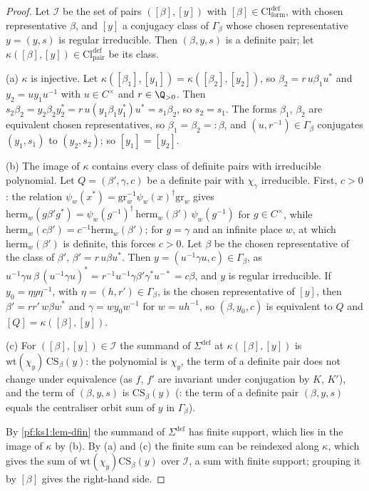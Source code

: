 \begin{proof}
Let $\mathcal I$ be the set of pairs $([\beta],[y])$ with $[\beta]\in\mathrm{Cl}^{\mathrm{def}}_{\mathrm{form}}$, with chosen representative $\beta$,
and $[y]$ a conjugacy class of $\Gamma_\beta$ whose chosen representative $y=(y,s)$ is regular irreducible. Then $(\beta,y,s)$ is a definite pair;
let $\kappa([\beta],[y])\in\mathrm{Cl}^{\mathrm{def}}_{\mathrm{pair}}$ be its class.

(a) $\kappa$ is injective. Let $\kappa([\beta_1],[y_1])=\kappa([\beta_2],[y_2])$, so $\beta_2=r\,u\beta_1u^*$ and $y_2=uy_1u^{-1}$ with $u\in C^\times$ and
$r\in\Q_{>0}$. Then $s_2\beta_2=y_2\beta_2y_2^*=r\,u(y_1\beta_1y_1^*)u^*=s_1\beta_2$, so $s_2=s_1$. The forms $\beta_1$, $\beta_2$ are
equivalent chosen representatives, so $\beta_1=\beta_2=:\beta$, and $(u,r^{-1})\in\Gamma_\beta$ conjugates $(y_1,s_1)$ to $(y_2,s_2)$; so $[y_1]=[y_2]$.

(b) The image of $\kappa$ contains every class of definite pairs with irreducible polynomial. Let $Q=(\beta',\gamma,c)$ be a definite pair with
$\chi_\gamma$ irreducible. First, $c>0$: the relation $\psi_w(x^*)=\mathrm{gr}_w^{-1}\psi_w(x)^\dagger\mathrm{gr}_w$ gives
$\mathrm{herm}_w(g\beta'g^*)=\psi_w(g^{-1})^\dagger\,\mathrm{herm}_w(\beta')\,\psi_w(g^{-1})$ for $g\in C^\times$, while
$\mathrm{herm}_w(c\beta')=c^{-1}\mathrm{herm}_w(\beta')$; for $g=\gamma$ and an infinite place $w$, at which $\mathrm{herm}_w(\beta')$ is definite,
this forces $c>0$. Let $\beta$ be the chosen representative of the class of $\beta'$, $\beta'=r\,u\beta u^*$. Then $y=(u^{-1}\gamma u,c)\in\Gamma_\beta$,
as $u^{-1}\gamma u\,\beta\,(u^{-1}\gamma u)^*=r^{-1}u^{-1}\gamma\beta'\gamma^*u^{-*}=c\beta$, and $y$ is regular irreducible. If $y_0=\eta y\eta^{-1}$, with
$\eta=(h,r')\in\Gamma_\beta$, is the chosen representative of $[y]$, then $\beta'=rr'\,w\beta w^*$ and $\gamma=wy_0w^{-1}$ for $w=uh^{-1}$, so $(\beta,y_0,c)$
is equivalent to $Q$ and $[Q]=\kappa([\beta],[y])$.

(c) For $([\beta],[y])\in\mathcal I$ the summand of $\Sigma^{\mathrm{def}}$ at $\kappa([\beta],[y])$ is $\mathrm{wt}(\chi_y)\,\mathrm{CS}_\beta(y)$: the
polynomial is $\chi_y$, the term of a definite pair does not change under equivalence (as $f$, $f'$ are invariant under conjugation by $K$, $K'$),
and the term of $(\beta,y,s)$ is $\mathrm{CS}_\beta(y)$ (: the term of a definite
pair $(\beta,y,s)$ equals the centraliser orbit sum of $y$ in $\Gamma_\beta$).

By \cref{pf:ks1:lem-dfin} the summand of $\Sigma^{\mathrm{def}}$ has finite support, which lies in the image of $\kappa$ by (b). By (a) and (c) the
finite sum can be reindexed along $\kappa$, which gives the sum of $\mathrm{wt}(\chi_y)\mathrm{CS}_\beta(y)$ over $\mathcal I$, a sum with finite
support; grouping it by $[\beta]$ gives the right-hand side.
\end{proof}


